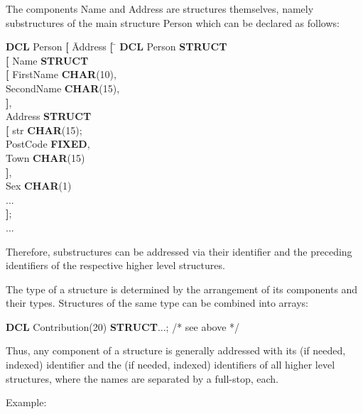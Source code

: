 The components Name and Address are structures themselves, namely
substructures of the main structure Person which can be declared as follows:


\begin{tabbing}
{\bf DCL} Person \= {\bf [} \= Address \= {\bf [} \= \kill
{\bf DCL} Person \>         \> {\bf STRUCT} \> \> \\
                 \> {\bf [} \> Name    \>         \> {\bf STRUCT}\\
                 \>         \>         \> {\bf [} \> FirstName {\bf CHAR}(10),\\
                 \>         \>         \>         \> SecondName {\bf CHAR}(15),\\
                 \>         \>         \> {\bf ]},\> \\
                 \>         \> Address \>         \> {\bf STRUCT}\\
                 \>         \>         \> {\bf [} \> str {\bf CHAR}(15);\\
                 \>         \>         \>         \> PostCode {\bf FIXED},\\
                 \>         \>         \>         \> Town {\bf CHAR}(15)\\
                 \>         \>         \> {\bf ]},\> \\
                 \>         \> Sex     \>         \> {\bf CHAR}(1)\\
                 \>         \> ...     \>         \> \\
                 \> {\bf ]};\>         \>         \> \\
...              \>         \>         \>         \>
\end{tabbing}

Therefore, substructures can be addressed via their identifier and the
preceding identifiers of the respective higher level structures.

The type of a structure is determined by the arrangement of its components
and their types. Structures of the same type can be combined into arrays:

{\bf DCL} Contribution(20) {\bf STRUCT}...;  /* see above */

Thus, any component of a structure is generally addressed with its (if
needed, indexed) identifier and the (if needed, indexed) identifiers of
all higher level structures, where the names are separated by a full-stop,
each.

Example:

